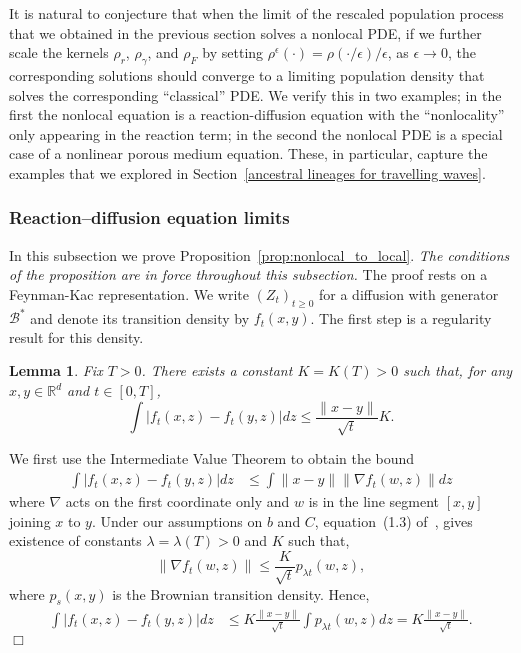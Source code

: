 \documentclass[12pt]{article}
\newenvironment {proof}{{\noindent\bf Proof }}{\hfill $\Box$ \medskip}
\newtheorem{lemma}[theorem]{Lemma}
\newcommand{\DG}{\mathcal{B}}  %
\numberwithin{equation}{section}
\begin{document}
It is natural to conjecture that when the limit of the rescaled 
population process that we obtained in the previous section solves a nonlocal
PDE, if we further scale the kernels 
$\rho_r$, $\rho_\gamma$, and $\rho_F$ by setting 
$\rho^\epsilon(\cdot)=\rho(\cdot/\epsilon)/\epsilon$, as $\epsilon\to 0$, the 
corresponding solutions should converge to a limiting
population density that solves the corresponding ``classical'' PDE. We verify
this in two examples; in the first the nonlocal equation is a reaction-diffusion equation
with the ``nonlocality'' only appearing in the 
reaction term; in the second the nonlocal PDE is a special 
case of a nonlinear porous medium equation. These, in particular,
capture the examples that we explored in 
Section~\ref{ancestral lineages for travelling waves}.

\subsubsection{Reaction--diffusion equation limits}
\label{two-step convergence to FKPP}

In this subsection we prove Proposition~\ref{prop:nonlocal_to_local}. {\em The conditions of the
proposition are in force throughout this subsection.} 
The proof rests on a Feynman-Kac representation.
We write $(Z_t)_{t\geq 0}$ for a diffusion with generator $\DG^*$ and denote 
its transition density by $f_t(x,y)$. The first step is a regularity
result for this density.

\begin{lemma} \label{regularityForX1}
Fix $T>0$. There exists a constant $K= K(T)>0$ such that, for any 
$x, y\in \mathbb{R}^d$ and $t \in [0,T]$,
\begin{equation} \label{eq:boundDensityXt}
\int |f_t(x,z)-f_t(y,z)| dz \leq \frac{\|x-y\|}{\sqrt{t}} K.
\end{equation}
\end{lemma}
\begin{proof}
We first use the Intermediate Value Theorem to obtain the bound
\begin{align*}
\int |f_t(x,z)-f_t(y,z)| dz & \leq \int \|x-y\| \|\nabla f_t(w,z)\| dz
\end{align*}
where $\nabla$ acts on the first coordinate only and $w$ is in the line 
segment $[x,y]$ joining $x$ to $y$. 
Under our assumptions on $b$ and $C$, equation~(1.3) 
of~\cite{sheu:1991}, gives existence of constants 
$\lambda=\lambda(T)>0$ and $K$ such that,
\[ \|\nabla f_t(w,z)\|  \leq  \frac{K }{\sqrt{t}}p_{ \lambda  t}(w,z), \]
where $p_s(x,y)$ is the Brownian transition density.
Hence, 
\begin{align*}
\int |f_t(x,z)-f_t(y,z)| dz & \leq K 
\frac{\|x-y\|}{\sqrt{t}} \int p_{\lambda  t}(w,z)dz = 
K  \frac{\|x-y\|}{\sqrt{t}} .
\end{align*}
\end{proof}
\end{document}
